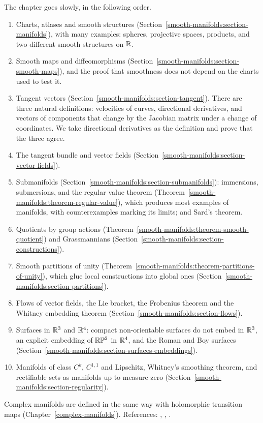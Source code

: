 The chapter goes slowly, in the following order.
\begin{enumerate}
\item Charts, atlases and smooth structures (Section~\ref{smooth-manifolds:section-manifolds}), with many examples: spheres, projective spaces, products, and two
different smooth structures on $\mathbb{R}$.
\item Smooth maps and diffeomorphisms (Section~\ref{smooth-manifolds:section-smooth-maps}), and the proof that smoothness does not depend on the charts used to
test it.
\item Tangent vectors (Section~\ref{smooth-manifolds:section-tangent}). There are three natural definitions: velocities of curves, directional derivatives, and
vectors of components that change by the Jacobian matrix under a change of coordinates. We take directional derivatives as the definition and prove that the
three agree.
\item The tangent bundle and vector fields (Section~\ref{smooth-manifolds:section-vector-fields}).
\item Submanifolds (Section~\ref{smooth-manifolds:section-submanifolds}): immersions, submersions, and the regular value theorem
(Theorem~\ref{smooth-manifolds:theorem-regular-value}), which produces most examples of manifolds, with counterexamples marking its limits; and Sard's theorem.
\item Quotients by group actions (Theorem~\ref{smooth-manifolds:theorem-smooth-quotient}) and Grassmannians
(Section~\ref{smooth-manifolds:section-constructions}).
\item Smooth partitions of unity (Theorem~\ref{smooth-manifolds:theorem-partitions-of-unity}), which glue local constructions into global ones
(Section~\ref{smooth-manifolds:section-partitions}).
\item Flows of vector fields, the Lie bracket, the Frobenius theorem and the Whitney embedding theorem (Section~\ref{smooth-manifolds:section-flows}).
\item Surfaces in $\mathbb{R}^3$ and $\mathbb{R}^4$: compact non-orientable surfaces do not embed in $\mathbb{R}^3$, an explicit embedding of $\mathbb{R}\mathbb{P}^2$ in $\mathbb{R}^4$, and the Roman and
Boy surfaces (Section~\ref{smooth-manifolds:section-surfaces-embeddings}).
\item Manifolds of class $C^k$, $C^{1,1}$ and Lipschitz, Whitney's smoothing theorem, and rectifiable sets as manifolds up to measure zero
(Section~\ref{smooth-manifolds:section-regularity}).
\end{enumerate}
Complex manifolds are defined in the same way with holomorphic transition maps (Chapter~\ref{complex-manifolds}). References:
\cite{lee-smooth-manifolds}, \cite{warner-foundations}, \cite{hirsch-differential-topology}.

